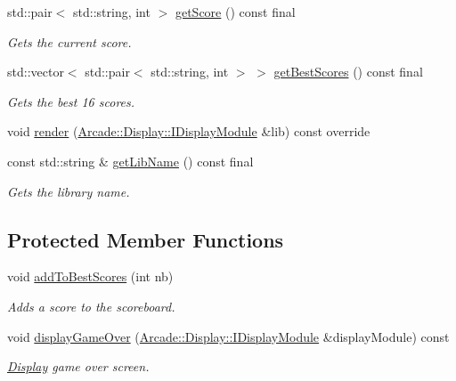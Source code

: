 \begin{DoxyCompactItemize}
std\+::pair$<$ std\+::string, int $>$ \mbox{\hyperlink{classArcade_1_1Games_1_1AGameModule_a83dbf1572ae5e25174bc7b81fed7ba77}{get\+Score}} () const final
\begin{DoxyCompactList}\small\item\em Gets the current score. \end{DoxyCompactList}\item 
std\+::vector$<$ std\+::pair$<$ std\+::string, int $>$ $>$ \mbox{\hyperlink{classArcade_1_1Games_1_1AGameModule_aaebba3bd5236f97cb18867fe99c7135b}{get\+Best\+Scores}} () const final
\begin{DoxyCompactList}\small\item\em Gets the best 16 scores. \end{DoxyCompactList}\item 
void \mbox{\hyperlink{classArcade_1_1Games_1_1AGameModule_a5897780d42d5faba3287c29b87f2b498}{render}} (\mbox{\hyperlink{classArcade_1_1Display_1_1IDisplayModule}{Arcade\+::\+Display\+::\+I\+Display\+Module}} \&lib) const override
\item 
const std\+::string \& \mbox{\hyperlink{classArcade_1_1Games_1_1AGameModule_a3245a3ba2eac74eadf5041bc3806ed6b}{get\+Lib\+Name}} () const final
\begin{DoxyCompactList}\small\item\em Gets the library name. \end{DoxyCompactList}\end{DoxyCompactItemize}
\subsection*{Protected Member Functions}
\begin{DoxyCompactItemize}
\item 
void \mbox{\hyperlink{classArcade_1_1Games_1_1AGameModule_a961c4a606bcc5d2ab1ead8b3c0bb3408}{add\+To\+Best\+Scores}} (int nb)
\begin{DoxyCompactList}\small\item\em Adds a score to the scoreboard. \end{DoxyCompactList}\item 
void \mbox{\hyperlink{classArcade_1_1Games_1_1AGameModule_a57720bc39e4b181450d1f78518123399}{display\+Game\+Over}} (\mbox{\hyperlink{classArcade_1_1Display_1_1IDisplayModule}{Arcade\+::\+Display\+::\+I\+Display\+Module}} \&display\+Module) const
\begin{DoxyCompactList}\small\item\em \mbox{\hyperlink{namespaceArcade_1_1Display}{Display}} game over screen. \end{DoxyCompactList}\end{DoxyCompactItemize}
